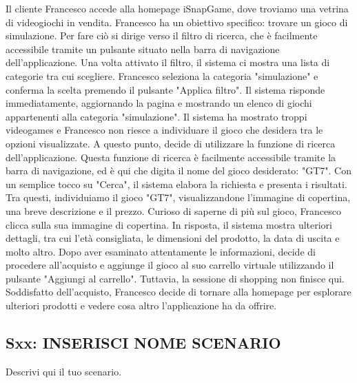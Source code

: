 \documentclass[12pt, a4paper, oneside]{book}
\begin{document}
    Il cliente Francesco accede alla homepage iSnapGame, dove troviamo una vetrina di videogiochi in vendita.
    Francesco ha un obiettivo specifico: trovare un gioco di simulazione. Per fare ciò si dirige verso il filtro di
    ricerca, che è facilmente accessibile tramite un pulsante situato nella barra di navigazione dell'applicazione.
    Una volta attivato il filtro, il sistema ci mostra una lista di categorie tra cui scegliere. Francesco seleziona la
    categoria "simulazione" e conferma la scelta premendo il pulsante "Applica filtro". Il sistema risponde
    immediatamente, aggiornando la pagina e mostrando un elenco di giochi appartenenti alla categoria "simulazione".
    Il sistema ha mostrato troppi videogames e Francesco non riesce a individuare il gioco che desidera tra le opzioni
    visualizzate. A questo punto, decide di utilizzare la funzione di ricerca dell'applicazione. Questa funzione di
    ricerca è facilmente accessibile tramite la barra di navigazione, ed è qui che digita il nome del gioco
    desiderato: "GT7". Con un semplice tocco su "Cerca", il sistema elabora la richiesta e presenta i risultati.
    Tra questi, individuiamo il gioco "GT7", visualizzandone l'immagine di copertina, una breve descrizione e il prezzo.
    Curioso di saperne di più sul gioco, Francesco clicca sulla sua immagine di copertina. In risposta, il sistema
    mostra ulteriori dettagli, tra cui l'età consigliata, le dimensioni del prodotto, la data di uscita e molto altro.
    Dopo aver esaminato attentamente le informazioni, decide di procedere all'acquisto e aggiunge il gioco al suo
    carrello virtuale utilizzando il pulsante "Aggiungi al carrello". Tuttavia, la sessione di shopping non finisce qui.
    Soddisfatto dell'acquisto, Francesco decide di tornare alla homepage per esplorare ulteriori prodotti e vedere cosa
    altro l'applicazione ha da offrire.


    \subsection*{Sxx: INSERISCI NOME SCENARIO}
        Descrivi qui il tuo scenario.
\end{document}
